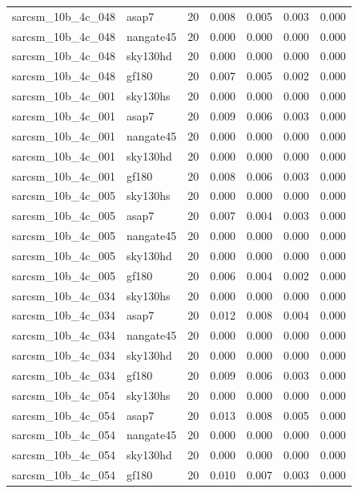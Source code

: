 \begin{tabular}{llrrrrr}
sarcsm\_10b\_4c\_048 & asap7 & 20 & 0.008 & 0.005 & 0.003 & 0.000 \\
sarcsm\_10b\_4c\_048 & nangate45 & 20 & 0.000 & 0.000 & 0.000 & 0.000 \\
sarcsm\_10b\_4c\_048 & sky130hd & 20 & 0.000 & 0.000 & 0.000 & 0.000 \\
sarcsm\_10b\_4c\_048 & gf180 & 20 & 0.007 & 0.005 & 0.002 & 0.000 \\
sarcsm\_10b\_4c\_001 & sky130hs & 20 & 0.000 & 0.000 & 0.000 & 0.000 \\
sarcsm\_10b\_4c\_001 & asap7 & 20 & 0.009 & 0.006 & 0.003 & 0.000 \\
sarcsm\_10b\_4c\_001 & nangate45 & 20 & 0.000 & 0.000 & 0.000 & 0.000 \\
sarcsm\_10b\_4c\_001 & sky130hd & 20 & 0.000 & 0.000 & 0.000 & 0.000 \\
sarcsm\_10b\_4c\_001 & gf180 & 20 & 0.008 & 0.006 & 0.003 & 0.000 \\
sarcsm\_10b\_4c\_005 & sky130hs & 20 & 0.000 & 0.000 & 0.000 & 0.000 \\
sarcsm\_10b\_4c\_005 & asap7 & 20 & 0.007 & 0.004 & 0.003 & 0.000 \\
sarcsm\_10b\_4c\_005 & nangate45 & 20 & 0.000 & 0.000 & 0.000 & 0.000 \\
sarcsm\_10b\_4c\_005 & sky130hd & 20 & 0.000 & 0.000 & 0.000 & 0.000 \\
sarcsm\_10b\_4c\_005 & gf180 & 20 & 0.006 & 0.004 & 0.002 & 0.000 \\
sarcsm\_10b\_4c\_034 & sky130hs & 20 & 0.000 & 0.000 & 0.000 & 0.000 \\
sarcsm\_10b\_4c\_034 & asap7 & 20 & 0.012 & 0.008 & 0.004 & 0.000 \\
sarcsm\_10b\_4c\_034 & nangate45 & 20 & 0.000 & 0.000 & 0.000 & 0.000 \\
sarcsm\_10b\_4c\_034 & sky130hd & 20 & 0.000 & 0.000 & 0.000 & 0.000 \\
sarcsm\_10b\_4c\_034 & gf180 & 20 & 0.009 & 0.006 & 0.003 & 0.000 \\
sarcsm\_10b\_4c\_054 & sky130hs & 20 & 0.000 & 0.000 & 0.000 & 0.000 \\
sarcsm\_10b\_4c\_054 & asap7 & 20 & 0.013 & 0.008 & 0.005 & 0.000 \\
sarcsm\_10b\_4c\_054 & nangate45 & 20 & 0.000 & 0.000 & 0.000 & 0.000 \\
sarcsm\_10b\_4c\_054 & sky130hd & 20 & 0.000 & 0.000 & 0.000 & 0.000 \\
sarcsm\_10b\_4c\_054 & gf180 & 20 & 0.010 & 0.007 & 0.003 & 0.000 \\

\end{tabular}
